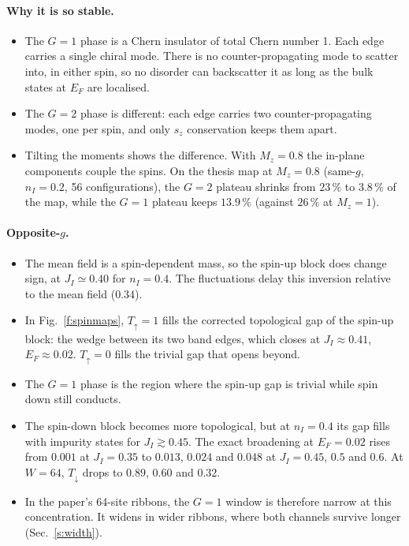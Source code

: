 \documentclass[11pt,a4paper]{article}
\newcommand{\up}{{\uparrow}}
\newcommand{\dn}{{\downarrow}}
\begin{document}
\paragraph{Why it is so stable.}
\begin{itemize}
\item The $G=1$ phase is a Chern insulator of total Chern number 1. Each edge carries a single
  chiral mode. There is no counter-propagating mode to scatter into, in either spin, so no
  disorder can backscatter it as long as the bulk states at $E_F$ are localised.
\item The $G=2$ phase is different: each edge carries two counter-propagating modes, one per
  spin, and only $s_z$ conservation keeps them apart.
\item Tilting the moments shows the difference. With $M_z=0.8$ the in-plane components couple
  the spins. On the thesis map at $M_z=0.8$ (same-$g$, $n_I=0.2$, 56 configurations), the
  $G=2$ plateau shrinks from $23\,\%$ to $3.8\,\%$ of the map, while the $G=1$ plateau keeps
  $13.9\,\%$ (against $26\,\%$ at $M_z=1$).
\end{itemize}

\paragraph{Opposite-$g$.}
\begin{itemize}
\item The mean field is a spin-dependent mass, so the spin-up block does change sign, at
  $J_I\simeq0.40$ for $n_I=0.4$. The fluctuations delay this inversion relative to the mean
  field ($0.34$).
\item In Fig.~\ref{f:spinmaps}, $T_\up=1$ fills the corrected topological gap of the spin-up
  block: the wedge between its two band edges, which closes at $J_I\approx0.41$,
  $E_F\approx0.02$. $T_\up=0$ fills the trivial gap that opens beyond.
\item The $G=1$ phase is the region where the spin-up gap is trivial while spin down still
  conducts.
\item The spin-down block becomes more topological, but at $n_I=0.4$ its gap fills with
  impurity states for $J_I\gtrsim0.45$. The exact broadening at $E_F=0.02$ rises from $0.001$ at
  $J_I=0.35$ to $0.013$, $0.024$ and $0.048$ at $J_I=0.45$, $0.5$ and $0.6$. At $W=64$, $T_\dn$
  drops to $0.89$, $0.60$ and $0.32$.
\item In the paper's 64-site ribbons, the $G=1$ window is therefore narrow at this
  concentration. It widens in wider ribbons, where both channels survive longer
  (Sec.~\ref{s:width}).
\end{itemize}
\end{document}
